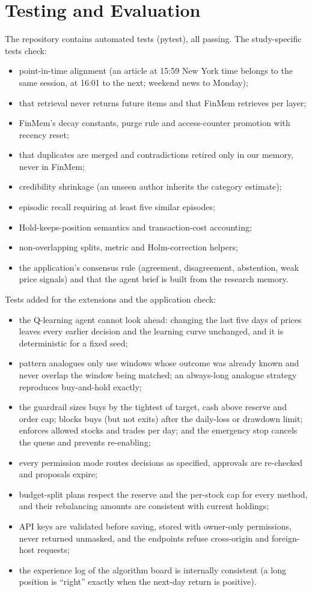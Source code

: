 \section{Testing and Evaluation}
The repository contains \testcount{} automated tests (pytest), all passing. The study-specific tests check:
\begin{itemize}
  \item point-in-time alignment (an article at 15:59 New York time belongs to the same session, at 16:01 to the next; weekend news to Monday);
  \item that retrieval never returns future items and that FinMem retrieves per layer;
  \item FinMem's decay constants, purge rule and access-counter promotion with recency reset;
  \item that duplicates are merged and contradictions retired only in our memory, never in FinMem;
  \item credibility shrinkage (an unseen author inherits the category estimate);
  \item episodic recall requiring at least five similar episodes;
  \item Hold-keeps-position semantics and transaction-cost accounting;
  \item non-overlapping splits, metric and Holm-correction helpers;
  \item the application's consensus rule (agreement, disagreement, abstention, weak price signals) and that the agent brief is built from the research memory.
\end{itemize}
Tests added for the extensions and the application check:
\begin{itemize}
  \item the Q-learning agent cannot look ahead: changing the last five days of prices leaves every earlier decision and the learning curve unchanged, and it is deterministic for a fixed seed;
  \item pattern analogues only use windows whose outcome was already known and never overlap the window being matched; an always-long analogue strategy reproduces buy-and-hold exactly;
  \item the guardrail sizes buys by the tightest of target, cash above reserve and order cap; blocks buys (but not exits) after the daily-loss or drawdown limit; enforces allowed stocks and trades per day; and the emergency stop cancels the queue and prevents re-enabling;
  \item every permission mode routes decisions as specified, approvals are re-checked and proposals expire;
  \item budget-split plans respect the reserve and the per-stock cap for every method, and their rebalancing amounts are consistent with current holdings;
  \item API keys are validated before saving, stored with owner-only permissions, never returned unmasked, and the endpoints refuse cross-origin and foreign-host requests;
  \item the experience log of the algorithm board is internally consistent (a long position is ``right'' exactly when the next-day return is positive).
\end{itemize}
